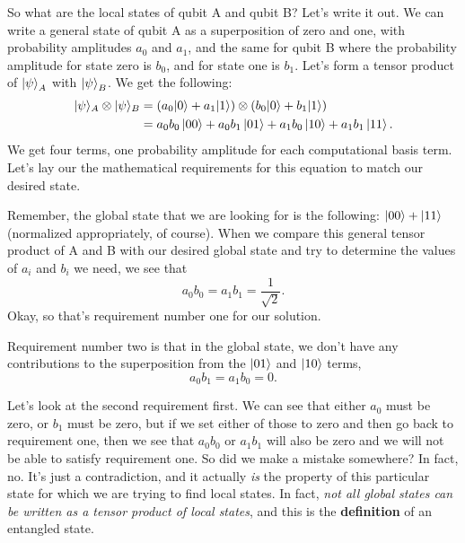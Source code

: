 So what are the local states of qubit A and qubit B? Let's write it out. We can write a general state of qubit A as a superposition of zero and one, with probability amplitudes $a_0$ and $a_1$, and the same for qubit B where the probability amplitude for state zero is $b_0$, and for state one is $b_1$. 
Let's form a tensor product of $\left| \psi \right\rangle_A$ with $\left| \psi \right\rangle_B$. We get the following: 
\begin{equation}
\begin{aligned}
|\psi\rangle_{A} \otimes|\psi\rangle_{B} &= \left(a_{0}|0\rangle+a_{1}|1\rangle\right) \otimes\left(b_{0}|0\rangle+b_{1}|1\rangle\right) \\
 &= a_0 b_0\left| 00 \right\rangle + a_0 b_1\left| 01 \right\rangle + a_1 b_0\left| 10 \right\rangle + a_1 b_1\left| 11 \right\rangle.
\end{aligned}
\end{equation}
We get four terms, one probability amplitude for each computational basis term. Let's lay our the mathematical requirements for this equation to match our desired state.

Remember, the global state that we are looking for is the following: $\left| 00 \right\rangle+\left| 11 \right\rangle$ (normalized appropriately, of course). 
When we compare this general tensor product of A and B with our desired global state and try to determine the values of $a_i$ and $b_i$ we need, we see that
\begin{equation}
a_{0} b_{0}=a_{1} b_{1}=\frac{1}{\sqrt{2}}.
\end{equation}
Okay, so that's requirement number one for our solution.

Requirement number two is that in the global state, we don't have any contributions to the superposition from the $\left| 01 \right\rangle$ and $\left| 10 \right\rangle$ terms,
\begin{equation}
a_0 b_1 = a_1 b_0 = 0.    
\end{equation}

Let's look at the second requirement first. We can see that either $a_0$ must be zero, or $b_1$ must be zero, but if we set either of those to zero and then go back to requirement one, then we see that $a_0 b_0$ or $a_1 b_1$ will also be zero and we will not be able to satisfy requirement one.
So did we make a mistake somewhere? In fact, no. It's just a contradiction, and it actually \emph{is} the property of this particular state for which we are trying to find local states. In fact, \emph{not all global states can be written as a tensor product of local states}, and this is the {\bf definition} of an entangled state.

